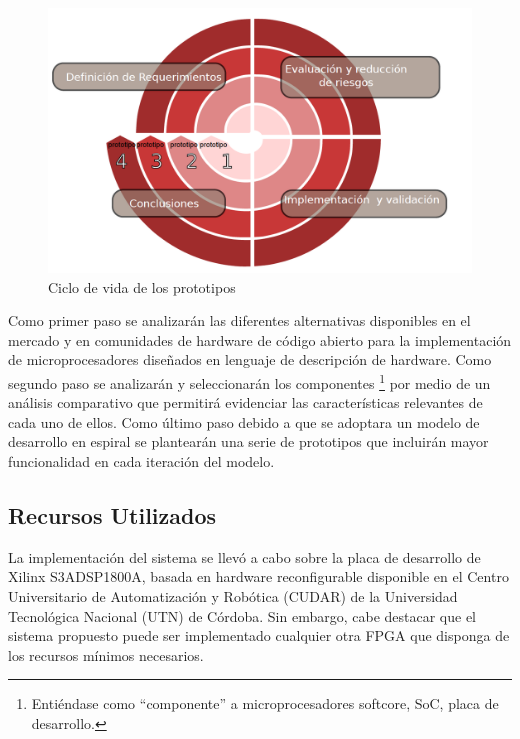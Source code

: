 \documentclass[conference]{IEEEtran}
\newcommand{\ScaleA}{1.0} %
\begin{document}
\begin{figure}[t] 
  \centerline{\includegraphics[width=\ScaleA\columnwidth]{figures_sources/espiral_paper}}%
    \caption{Ciclo de vida de los prototipos}
    \label{fig:pro3enc} 
\end{figure}


Como primer paso se analizarán las diferentes
alternativas disponibles en el mercado y en comunidades de hardware de
código abierto para la implementación de microprocesadores diseñados
en lenguaje de descripción de hardware. Como segundo paso 
se analizarán y seleccionarán los componentes \footnote{Entiéndase como ``componente'' a microprocesadores softcore, SoC, placa de desarrollo.} por medio de un análisis comparativo que permitirá evidenciar las características relevantes de
cada uno de ellos. Como último paso debido a que se adoptara un modelo de desarrollo en espiral se plantearán una serie de prototipos que incluirán mayor funcionalidad en cada iteración del modelo.

\subsection{Recursos Utilizados}

La implementación del sistema se llevó a cabo sobre la placa de
desarrollo de Xilinx S3ADSP1800A, basada en hardware reconfigurable disponible en
el Centro Universitario de Automatización y Robótica (CUDAR) de la
Universidad Tecnológica Nacional (UTN) de Córdoba. Sin embargo, cabe
destacar que el sistema propuesto puede ser implementado cualquier
otra FPGA que disponga de los recursos mínimos necesarios.

\end{document}
